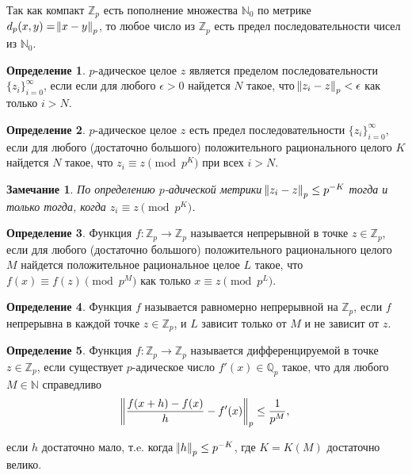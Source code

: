 \documentclass[master, och, diploma, times]{sty/SCWorks}
\theoremstyle{plain}
\newtheorem{note}{Замечание}[section]
\theoremstyle{definition}
\newtheorem{defn}{Определение}[section]
\begin{document}
Так как компакт $\mathbb {Z}_p$ есть пополнение множества $\mathbb {N}_0$ по метрике \linebreak ${d_p(x,y)=\norm{x-y}_p}$, то любое число из $\mathbb {Z}_p$ есть предел последовательности чисел из $\mathbb {N}_0$.

\begin{defn}
$p$-адическое целое $z$ является пределом последовательности $\{z_i\}^{\infty}_{i=0}$, если если для любого $\epsilon > 0$ найдется $N$ такое, что $\norm{z_i-z}_p < \epsilon$ как только $i>N$. \cite{bib:analysis:anashin}
\end{defn}

\begin{defn}
$p$-адическое целое $z$ есть предел последовательности $\{z_i\}^{\infty}_{i=0}$, если для любого (достаточно большого) положительного рационального целого $K$ найдется $N$ такое, что ${z_i \equiv z \pmod p^K}$ при всех $i>N$. \cite{bib:analysis:anashin}
\end{defn}

\begin{note}
По определению $p$-адической метрики $\norm{z_i-z}_p \le p^{-K}$ тогда и только тогда, когда $z_i \equiv z \pmod p^K$. \cite{bib:analysis:anashin}
\end{note}

\begin{defn}
Функция $f:\mathbb {Z}_p \rightarrow \mathbb {Z}_p$ называется непрерывной в точке $z \in \mathbb {Z}_p$, если для любого (достаточно большого) положительного рационального целого $M$ найдется положительное рациональное целое $L$ такое, что ${f(x) \equiv f(z) \pmod p^M}$ как только $x \equiv z \pmod{p^L}$. \cite{bib:analysis:anashin}
\end{defn}

\begin{defn}
Функция $f$ называется равномерно непрерывной на $\mathbb {Z}_p$, если $f$ непрерывна в каждой точке $z \in \mathbb {Z}_p$, и $L$ зависит только от $M$ и не зависит от $z$.\cite{bib:analysis:ciocan}
\end{defn}


\begin{defn}
Функция $f:\mathbb {Z}_p \rightarrow \mathbb {Z}_p$ называется дифференцируемой в точке $z \in \mathbb {Z}_p$, если существует $p$-адическое число $f'(x) \in \mathbb {Q}_p$ такое, что для любого $M \in \mathbb {N}$ справедливо
\begin{equation} \label{derivative:1}
	\norm{\frac{f(x+h)-f(x)}{h} - f'(x)}_p \le \frac{1}{p^M},
\end{equation}

\noindent если $h$ достаточно мало, т.e. когда $\norm{h}_p \le p^{-K}$, где $K=K(M)$ достаточно велико.
\end{defn}
\end{document}
